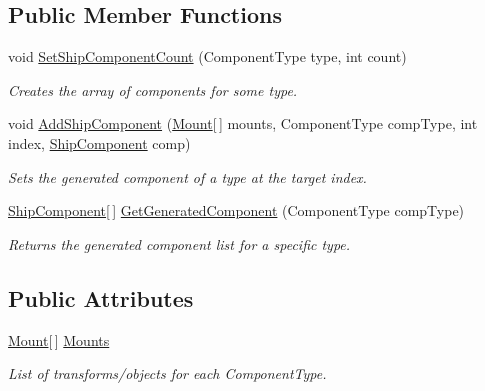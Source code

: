 \subsection*{Public Member Functions}
\begin{DoxyCompactItemize}
\item 
void \hyperlink{class_skyrates_1_1_client_1_1_ship_1_1_ship_hull_a708dd2846b4a6c0d2a04f017154ab23c}{Set\-Ship\-Component\-Count} (Component\-Type type, int count)
\begin{DoxyCompactList}\small\item\em Creates the array of components for some type. \end{DoxyCompactList}\item 
void \hyperlink{class_skyrates_1_1_client_1_1_ship_1_1_ship_hull_aca3fed341f7bb7d6e5b8c33031473b19}{Add\-Ship\-Component} (\hyperlink{struct_skyrates_1_1_client_1_1_ship_1_1_ship_hull_1_1_mount}{Mount}\mbox{[}$\,$\mbox{]} mounts, Component\-Type comp\-Type, int index, \hyperlink{class_skyrates_1_1_client_1_1_ship_1_1_ship_component}{Ship\-Component} comp)
\begin{DoxyCompactList}\small\item\em Sets the generated component of a type at the target index. \end{DoxyCompactList}\item 
\hyperlink{class_skyrates_1_1_client_1_1_ship_1_1_ship_component}{Ship\-Component}\mbox{[}$\,$\mbox{]} \hyperlink{class_skyrates_1_1_client_1_1_ship_1_1_ship_hull_a36b0a400d6afaeed933863f1f61ed2a5}{Get\-Generated\-Component} (Component\-Type comp\-Type)
\begin{DoxyCompactList}\small\item\em Returns the generated component list for a specific type. \end{DoxyCompactList}\end{DoxyCompactItemize}
\subsection*{Public Attributes}
\begin{DoxyCompactItemize}
\item 
\hyperlink{struct_skyrates_1_1_client_1_1_ship_1_1_ship_hull_1_1_mount}{Mount}\mbox{[}$\,$\mbox{]} \hyperlink{class_skyrates_1_1_client_1_1_ship_1_1_ship_hull_ae4226c65a2653290aa04aa2b891585ce}{Mounts}
\begin{DoxyCompactList}\small\item\em List of transforms/objects for each Component\-Type. \end{DoxyCompactList}\end{DoxyCompactItemize}


